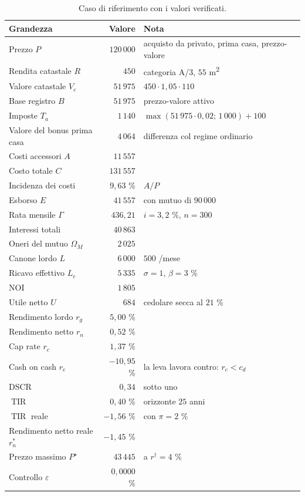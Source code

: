 \documentclass[11pt,a4paper]{article}
\theoremstyle{definition}
\theoremstyle{plain}
\newcommand{\euro}{\texteuro}
\DeclareMathOperator{\TIR}{TIR}
\begin{document}
\begin{table}[H]
\centering
\small
\begin{tabular}{@{}lrl@{}}
\toprule
Grandezza & Valore & Nota \\
\midrule
Prezzo $P$ & $120\,000$ \euro & acquisto da privato, prima casa, prezzo-valore \\
Rendita catastale $R$ & $450$ \euro & categoria A/3, $55$ m\textsuperscript{2} \\
Valore catastale $V_c$ & $51\,975$ \euro & $450 \cdot 1{,}05 \cdot 110$ \\
Base registro $B$ & $51\,975$ \euro & prezzo-valore attivo \\
Imposte $T_a$ & $1\,140$ \euro & $\max(51\,975\cdot 0{,}02;\,1\,000)+100$ \\
Valore del bonus prima casa & $4\,064$ \euro & differenza col regime ordinario \\
Costi accessori $A$ & $11\,557$ \euro & \\
Costo totale $C$ & $131\,557$ \euro & \\
Incidenza dei costi & $9{,}63$ \% & $A/P$ \\
Esborso $E$ & $41\,557$ \euro & con mutuo di $90\,000$ \\
Rata mensile $\Gamma$ & $436{,}21$ \euro & $i=3{,}2$ \%, $n=300$ \\
Interessi totali & $40\,863$ \euro & \\
Oneri del mutuo $\Omega_M$ & $2\,025$ \euro & \\
Canone lordo $L$ & $6\,000$ \euro & $500$ \euro/mese \\
Ricavo effettivo $L_e$ & $5\,335$ \euro & $\sigma=1$, $\beta=3$ \% \\
$\mathrm{NOI}$ & $1\,805$ \euro & \\
Utile netto $U$ & $684$ \euro & cedolare secca al $21$ \% \\
Rendimento lordo $r_g$ & $5{,}00$ \% & \\
Rendimento netto $r_n$ & $0{,}52$ \% & \\
Cap rate $r_c$ & $1{,}37$ \% & \\
Cash on cash $r_e$ & $-10{,}95$ \% & la leva lavora contro: $r_c < c_d$ \\
$\mathrm{DSCR}$ & $0{,}34$ & sotto uno \\
$\TIR$ & $0{,}40$ \% & orizzonte $25$ anni \\
$\TIR$ reale & $-1{,}56$ \% & con $\pi=2$ \% \\
Rendimento netto reale $r_n^*$ & $-1{,}45$ \% & \\
Prezzo massimo $P^\star$ & $43\,445$ \euro & a $r^\dagger=4$ \% \\
Controllo $\varepsilon$ & $0{,}0000$ \% & \\
\bottomrule
\end{tabular}
\caption{Caso di riferimento con i valori verificati.}
\end{table}
\end{document}
